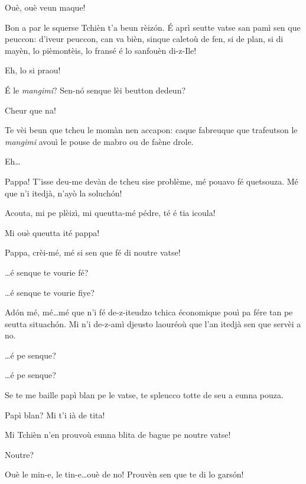 \begin{drama}
\Mariettospeaks Ouè, ouè veun maque!


\Mariettospeaks Bon a par le squerse Tchièn t’a beun rèiz\'on. \'E aprì seutte vatse san pamì sen que peuccon: d’iveur peuccon, can va bièn, sinque caletoù de fen, si de plan, si di mayèn, lo pièmontèis, lo fransé é lo sanfouèn di-z-Ile!


\Cienspeaks {} Eh, lo si praou!

\Mariettospeaks \'E le \textit{mangimi}? Sen-n\'o senque lèi beutton dedeun?

\Cienspeaks Cheur que na!

\Mariettospeaks Te vèi beun que tcheu le momàn nen accapon: caque fabreuque que trafeutson le \textit{mangimi} avouì le pouse de mabro ou de faène drole.

\Cienspeaks {} Eh\ldots 

\Simonspeaks {} Pappa!  T’isse deu-me devàn de tcheu sise problème, mé pouavo fé quetsouza. Mé que n'i itedjà, n'ayò la soluch\'on!

\Cienspeaks Acouta, mi pe plèizì, mi queutta-mé pédre, té é tia icoula!

\Mariettospeaks Mi ouè queutta ité pappa!

\Simonspeaks Pappa, crèi-mé, mé si sen que fé di noutre vatse! 

\Cienspeaks \ldots é senque te vourie fé?

\Mariettospeaks \ldots é senque te vourie fiye?

\Simonspeaks Ad\'on mé, mé\ldots mé que n'i fé de-z-iteudzo tchica économique pouì pa fére tan pe seutta situach\'on. Mi n’i de-z-amì djeusto laouréoù que l’an itedjà sen que servèi a no.

\Cienspeaks \ldots é pe senque?

\Mariettospeaks \ldots é pe senque?

\Simonspeaks Se te me baille papì blan pe le vatse, te spleucco totte de seu a eunna pouza.

\Cienspeaks Papì blan? Mi t'i ià de tita!

\Mariettospeaks Mi Tchièn n’en prouvoù eunna blita de bague pe noutre vatse! 

\Cienspeaks Noutre? \doute

\Mariettospeaks  Ouè le min-e, le tin-e\ldots ouè de no! Prouvèn sen que te di lo gars\'on!


\end{drama}
